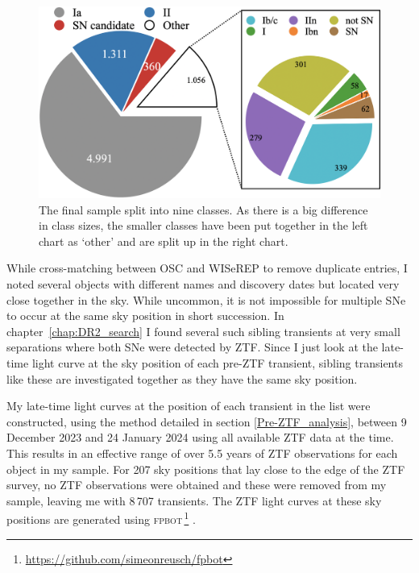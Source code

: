 \documentclass[a4paper,oneside,12pt, class=Latex/Classes/PhDthesisPSnPDF, crop=false]{standalone}
\begin{document}
\begin{figure}
    \centering
    \includegraphics[width=\textwidth]{../Images/chapter_4/sample_pie.png}
    \caption[Classes in the pre-ZTF sample.]{The final sample split into nine classes. As there is a big difference in class sizes, the smaller classes have been put together in the left chart as `other' and are split up in the right chart.}
    \label{class_breakdown}
\end{figure}

While cross-matching between OSC and WISeREP to remove duplicate entries, I noted several objects with different names and discovery dates but located very close together in the sky. While uncommon, it is not impossible for multiple SNe to occur at the same sky position in short succession. In chapter~\ref{chap:DR2_search} I found several such sibling transients at very small separations where both SNe were detected by ZTF. Since I just look at the late-time light curve at the sky position of each pre-ZTF transient, sibling transients like these are investigated together as they have the same sky position.

My late-time light curves at the position of each transient in the list were constructed, using the method detailed in section \ref{Pre-ZTF_analysis}, between 9 December 2023 and 24 January 2024 using all available ZTF data at the time. This results in an effective range of over 5.5 years of ZTF observations for each object in my sample. For 207 sky positions that lay close to the edge of the ZTF survey, no ZTF observations were obtained and these were removed from my sample, leaving me with 8\,707 transients. The ZTF light curves at these sky positions are generated using \textsc{fpbot}\,\footnote{\url{https://github.com/simeonreusch/fpbot}} \citep{fpbot}.
\end{document}
